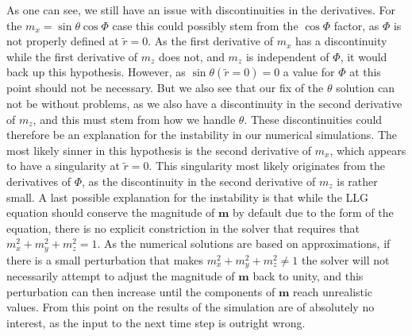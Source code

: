 As one can see, we still have an issue with discontinuities in the derivatives. For the $m_x = \sin\theta\cos\Phi$ case this could possibly stem from the $\cos\Phi$ factor, as $\Phi$ is not properly defined at $\tilde{r}=0$. As the first derivative of $m_x$ has a discontinuity while the first derivative of $m_z$ does not, and $m_z$ is independent of $\Phi$, it would back up this hypothesis. However, as $\sin\theta(\tilde{r}=0)=0$ a value for $\Phi$ at this point should not be necessary. But we also see that our fix of the $\theta$ solution can not be without problems, as we also have a discontinuity in the second derivative of $m_z$, and this must stem from how we handle $\theta$. These discontinuities could therefore be an explanation for the instability in our numerical simulations. The most likely sinner in this hypothesis is the second derivative of $m_x$, which appears to have a singularity at $\tilde{r}=0$. This singularity most likely originates from the derivatives of $\Phi$, as the discontinuity in the second derivative of $m_z$ is rather small. A last possible explanation for the instability is that while the LLG equation should conserve the magnitude of $\mathbold{m}$ by default due to the form of the equation, there is no explicit constriction in the solver that requires that $m_x^2+m_y^2+m_z^2=1$. As the numerical solutions are based on approximations, if there is a small perturbation that makes $m_x^2+m_y^2+m_z^2\neq1$ the solver will not necessarily attempt to adjust the magnitude of $\mathbold{m}$ back to unity, and this perturbation can then increase until the components of $\mathbold{m}$ reach unrealistic values. From this point on the results of the simulation are of absolutely no interest, as the input to the next time step is outright wrong.

